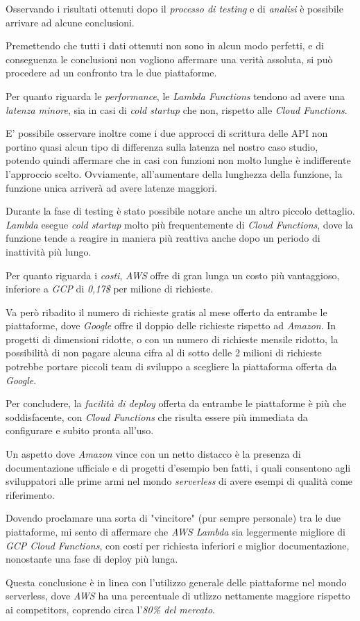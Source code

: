 Osservando i risultati ottenuti dopo il \textit{processo di testing} e di \textit{analisi} è possibile arrivare ad alcune conclusioni.

Premettendo che tutti i dati ottenuti non sono in alcun modo perfetti, e di conseguenza le conclusioni non vogliono affermare una verità assoluta, si può procedere ad un confronto tra le due piattaforme.

Per quanto riguarda le \textit{performance}, le \textit{Lambda Functions} tendono ad avere una \textit{latenza minore}, sia in casi di \textit{cold startup} che non, rispetto alle \textit{Cloud Functions}.

E' possibile osservare inoltre come i due approcci di scrittura delle API non portino quasi alcun tipo di differenza sulla latenza nel nostro caso studio, potendo quindi affermare che in casi con funzioni non molto lunghe è indifferente l'approccio scelto. Ovviamente, all'aumentare della lunghezza della funzione, la funzione unica arriverà ad avere latenze maggiori.

Durante la fase di testing è stato possibile notare anche un altro piccolo dettaglio. \textit{Lambda} esegue \textit{cold startup} molto più frequentemente di \textit{Cloud Functions}, dove la funzione tende a reagire in maniera più reattiva anche dopo un periodo di inattività più lungo.

Per quanto riguarda i \textit{costi}, \textit{AWS} offre di gran lunga un costo più vantaggioso, inferiore a \textit{GCP} di \textit{0,17\$} per milione di richieste.

Va però ribadito il numero di richieste gratis al mese offerto da entrambe le piattaforme, dove \textit{Google} offre il doppio delle richieste rispetto ad \textit{Amazon}. In progetti di dimensioni ridotte, o con un numero di richieste mensile ridotto, la possibilità di non pagare alcuna cifra al di sotto delle 2 milioni di richieste potrebbe portare piccoli team di sviluppo a scegliere la piattaforma offerta da \textit{Google}.

Per concludere, la \textit{facilità di deploy} offerta da entrambe le piattaforme è più che soddisfacente, con \textit{Cloud Functions} che risulta essere più immediata da configurare e subito pronta all'uso.

Un aspetto dove \textit{Amazon} vince con un netto distacco è la presenza di documentazione ufficiale e di progetti d'esempio ben fatti, i quali consentono agli sviluppatori alle prime armi nel mondo \textit{serverless} di avere esempi di qualità come riferimento.

Dovendo proclamare una sorta di "vincitore" (pur sempre personale) tra le due piattaforme, mi sento di affermare che \textit{AWS Lambda} sia leggermente migliore di \textit{GCP Cloud Functions}, con costi per richiesta inferiori e miglior documentazione, nonostante una fase di deploy più lunga.

Questa conclusione è in linea con l'utilizzo generale delle piattaforme nel mondo serverless, dove \textit{AWS} ha una percentuale di utlizzo nettamente maggiore rispetto ai competitors, coprendo circa l'\textit{80\% del mercato}\cite{eismann2021state}.